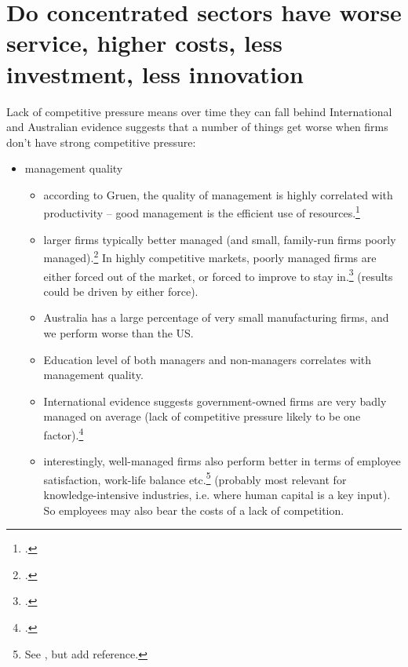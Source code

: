 \section{Do concentrated sectors have worse service, higher costs, less investment, less innovation}

Lack of competitive pressure means over time they can fall behind
International and Australian evidence suggests that a number of things get worse when firms don't have strong competitive pressure: 
\begin{itemize}
    \item management quality %
    \begin{itemize}
        \item according to Gruen, the quality of management is highly correlated with productivity -- good management is the efficient use of resources.\footcite{gruen2012productivity}
        \item larger firms typically better managed (and small, family-run firms poorly managed).\footcites{gruen2012productivity,bloom2010management} In highly competitive markets, poorly managed firms are either forced out of the market, or forced to improve to stay in.\footcite{bloom2010management} (results could be driven by either force).
        \item Australia has a large percentage of very small manufacturing firms, and we perform worse than the US.
        \item Education level of both managers and non-managers correlates with management quality.
        \item International evidence suggests government-owned firms are very badly managed on average (lack of competitive pressure likely to be one factor).\footcite{bloom2010management}
        \item interestingly, well-managed firms also perform better in terms of employee satisfaction, work-life balance etc.\footnote{See \textcite{bloom2010management}, but add reference.} (probably most relevant for knowledge-intensive industries, i.e. where human capital is a key input). So employees may also bear the costs of a lack of competition. 

\end{itemize}
\end{itemize}
